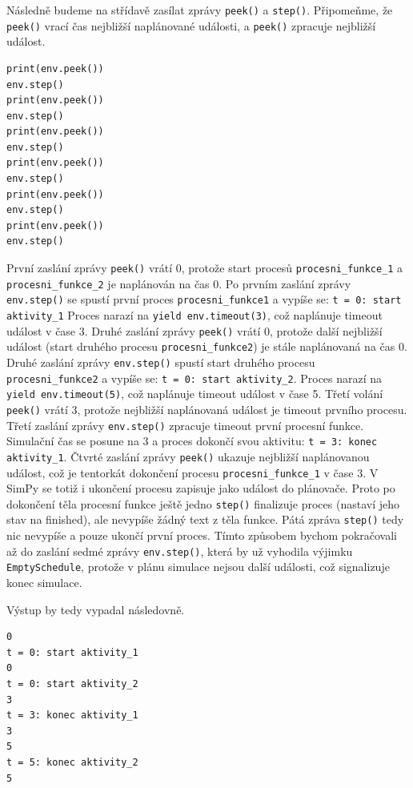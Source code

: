 \documentclass[12pt,a4paper]{article}
\begin{document}
\noindent Následně budeme na střídavě zasílat zprávy \texttt{peek()} a \texttt{step()}. Připomeňme, že \texttt{peek()}  vrací čas nejbližší naplánované události, a \texttt{peek()} zpracuje nejbližší událost.

 \begin{verbatim} 
print(env.peek())
env.step()
print(env.peek())
env.step()
print(env.peek())
env.step()
print(env.peek())
env.step()
print(env.peek())
env.step()
print(env.peek())
env.step()
\end{verbatim}

\noindent První zaslání zprávy \texttt{peek()} vrátí 0, protože start procesů \texttt{procesni\_funkce\_1} a \texttt{procesni\_funkce\_2} je naplánován na čas 0. 
Po prvním zaslání zprávy \texttt{env.step()} se spustí první proces \texttt{procesni\_funkce1} a vypíše se: \texttt{t = 0: start aktivity\_1}
Proces narazí na \texttt{yield env.timeout(3)}, což naplánuje timeout událost v čase 3. Druhé zaslání zprávy \texttt{peek()} vrátí 0, protože další nejbližší událost (start druhého procesu \texttt{procesni\_funkce2}) je stále naplánovaná na čas 0. Druhé zaslání zprávy \texttt{env.step()} spustí start druhého procesu \texttt{procesni\_funkce2} a vypíše se: \texttt{t = 0: start aktivity\_2}. Proces narazí na \texttt{yield env.timeout(5)}, což naplánuje timeout událost v čase 5. Třetí volání \texttt{peek()} vrátí 3, protože nejbližší naplánovaná událost je timeout prvního procesu. Třetí zaslání zprávy \texttt{env.step()} zpracuje timeout první procesní funkce. Simulační čas se posune na 3 a proces dokončí svou aktivitu: \texttt{t = 3: konec aktivity\_1}. Čtvrté zaslání zprávy \texttt{peek()} ukazuje nejbližší naplánovanou událost, což je tentorkát dokončení procesu \texttt{procesni\_funkce\_1} v čase 3. V SimPy se totiž i ukončení procesu zapisuje jako událost do plánovače. Proto po dokončení těla procesní funkce ještě jedno \texttt{step()} finalizuje proces (nastaví jeho stav na finished), ale nevypíše žádný text z těla funkce. Pátá zpráva \texttt{step()} tedy nic nevypíše a pouze ukončí první proces.
Tímto způsobem bychom pokračovali až do zaslání sedmé zprávy \texttt{env.step()}, která by už vyhodila výjimku \texttt{EmptySchedule}, protože v plánu simulace nejsou další události, což signalizuje konec simulace.

\noindent Výstup by tedy vypadal následovně.

 \begin{verbatim} 
0
t = 0: start aktivity_1
0
t = 0: start aktivity_2
3
t = 3: konec aktivity_1
3
5
t = 5: konec aktivity_2
5
\end{verbatim}
\end{document}
